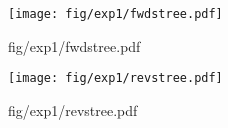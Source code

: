 
\begin{figure}[t]
  \texttt{[image: fig/exp1/fwdstree.pdf]}
  \caption{{fig/exp1/fwdstree.pdf}}
\end{figure}

\begin{figure}[t]
  \texttt{[image: fig/exp1/revstree.pdf]}
  \caption{{fig/exp1/revstree.pdf}}
\end{figure}


